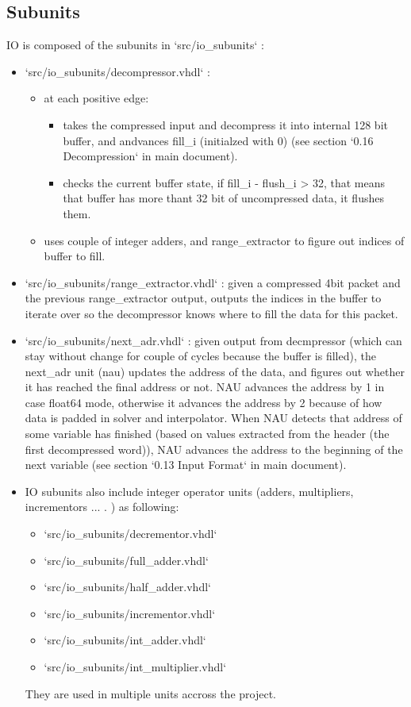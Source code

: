 \documentclass[12pt]{report}
\begin{document}
    \subsection{Subunits}
    IO is composed of the subunits in `src/io\_subunits` :
    \begin{itemize}
        \item `src/io\_subunits/decompressor.vhdl` : 
        \begin{itemize}
            \item at each positive edge:
            \begin{itemize}
                \item takes the compressed input and decompress it into internal 128 bit buffer, and andvances fill\_i (initialzed with 0) (see section `0.16 Decompression` in main document).
                \item checks the current buffer state, if fill\_i - flush\_i > 32, that means that buffer has more thant 32 bit of uncompressed data, it flushes them.
            \end{itemize}
            \item uses couple of integer adders, and range\_extractor to figure out indices of buffer to fill.
        \end{itemize}
        \item `src/io\_subunits/range\_extractor.vhdl` : given a compressed 4bit packet and the previous range\_extractor output, outputs the indices in the buffer to iterate over so the decompressor knows where to fill the data for this packet. 
        \item `src/io\_subunits/next\_adr.vhdl` : given output from decmpressor (which can stay without change for couple of cycles because the buffer is filled), the next\_adr unit (nau) updates the address of the data, and figures out whether it has reached the final address or not. NAU advances the address by 1 in case float64 mode, otherwise it advances the address by 2 because of how data is padded in solver and interpolator. When NAU detects that address of some variable has finished (based on values extracted from the header (the first decompressed word)), NAU advances the address to the beginning of the next variable (see section `0.13 Input Format` in main document). 
        \item IO subunits also include integer operator units (adders, multipliers, incrementors ... . ) as following:
        \begin{itemize}
            \item `src/io\_subunits/decrementor.vhdl` 
            \item `src/io\_subunits/full\_adder.vhdl` 
            \item `src/io\_subunits/half\_adder.vhdl` 
            \item `src/io\_subunits/incrementor.vhdl` 
            \item `src/io\_subunits/int\_adder.vhdl` 
            \item `src/io\_subunits/int\_multiplier.vhdl` 
        \end{itemize}
        They are used in multiple units accross the project. 
    \end{itemize}
\end{document}
